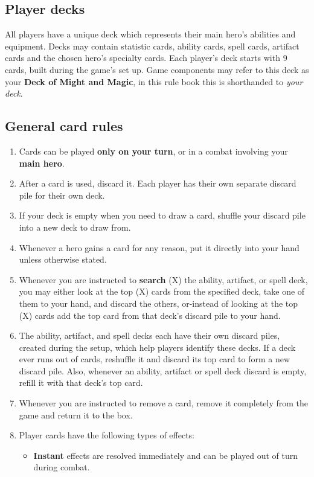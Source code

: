 \documentclass[12pt]{article}
\def\assets{assets}
\def\svgs{\assets/svgs}
\begin{document}
\clearpage
\subsection*{\hypertarget{Playerdecks}{Player decks}}
All players have a unique deck which represents their main hero's abilities and equipment. Decks may contain statistic cards, ability cards, spell cards, artifact cards and the chosen hero’s specialty cards. Each player’s deck starts with 9 cards, built during the game’s set up. Game components may refer to this deck as your \textbf{Deck of Might and Magic}, in this rule book this is shorthanded to \textit{your deck}.
\subsection*{General card rules}
\begin{enumerate}
	\item Cards can be played \textbf{only on your turn}, or in a combat involving your \textbf{main hero}.
	\item After a card is used, discard it. Each player has their own separate discard pile for their own deck.
	\item If your deck is empty when you need to draw a card, shuffle your discard pile into a new deck to draw from.
	\item Whenever a hero gains a card for any reason, put it directly into your hand unless otherwise stated. 
    \item Whenever you are instructed to \textbf{search} (X) the ability, artifact, or spell deck, you may either look at the top (X) cards from the specified deck, take one of them to your hand, and discard the others, or-instead of looking at the top (X) cards add the top card from that deck’s discard pile to your hand.
    \item The ability, artifact, and spell decks each have their own discard piles, created during the setup, which help players identify these decks. If a deck ever runs out of cards, reshuffle it and discard its top card to form a new discard pile. Also, whenever an ability, artifact or spell deck discard is empty, refill it with that deck’s top card.
    \item Whenever you are instructed to remove a card, remove it completely from the game and return it to the box.
    \item Player cards have the following types of effects:
    \begin{itemize}
        \item \textbf{Instant}  effects are resolved immediately and can be played out of turn during combat.

\end{itemize}
\end{enumerate}
\end{document}
